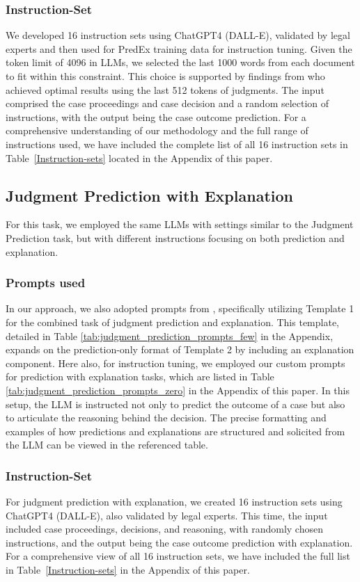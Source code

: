 \subsubsection{Instruction-Set}
We developed 16 instruction sets using ChatGPT4 (DALL-E), validated by legal experts and then used for PredEx training data for instruction tuning. Given the token limit of 4096 in LLMs, we selected the last 1000 words from each document to fit within this constraint. This choice is supported by findings from \cite{malik-etal-2021-ildc} who achieved optimal results using the last 512 tokens of judgments. The input comprised the case proceedings and case decision and a random selection of instructions, with the output being the case outcome prediction. For a comprehensive understanding of our methodology and the full range of instructions used, we have included the complete list of all 16 instruction sets in Table~\ref{Instruction-sets} located in the Appendix of this paper.

\subsection{Judgment Prediction with Explanation}
For this task, we employed the same LLMs with settings similar to the Judgment Prediction task, but with different instructions focusing on both prediction and explanation.

\subsubsection{Prompts used}
In our approach, we also adopted prompts from \cite{vats-etal-2023-llms}, specifically utilizing Template 1 for the combined task of judgment prediction and explanation. This template, detailed in Table \ref{tab:judgment_prediction_prompts_few} in the Appendix, expands on the prediction-only format of Template 2 by including an explanation component. Here also, for instruction tuning, we employed our custom prompts for prediction with explanation tasks, which are listed in Table \ref{tab:judgment_prediction_prompts_zero} in the Appendix of this paper. In this setup, the LLM is instructed not only to predict the outcome of a case but also to articulate the reasoning behind the decision. The precise formatting and examples of how predictions and explanations are structured and solicited from the LLM can be viewed in the referenced table.

\subsubsection{Instruction-Set}
For judgment prediction with explanation, we created 16 instruction sets using ChatGPT4 (DALL-E), also validated by legal experts. This time, the input included case proceedings, decisions, and reasoning, with randomly chosen instructions, and the output being the case outcome prediction with explanation. For a comprehensive view of all 16 instruction sets, we have included the full list in Table~\ref{Instruction-sets} in the Appendix of this paper.
